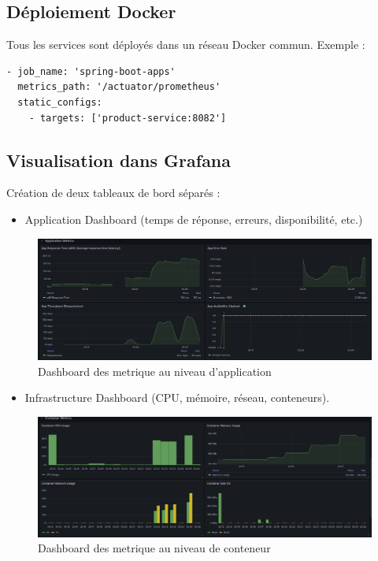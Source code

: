 \subsection{Déploiement Docker}
Tous les services sont déployés dans un réseau Docker commun.  
Exemple :
\begin{verbatim}
- job_name: 'spring-boot-apps'
  metrics_path: '/actuator/prometheus'
  static_configs:
    - targets: ['product-service:8082']
\end{verbatim}

\subsection{Visualisation dans Grafana}
Création de deux tableaux de bord séparés :
\begin{itemize}
    \item Application Dashboard (temps de réponse, erreurs, disponibilité, etc.)
\end{itemize}   
\begin{figure}[H]
\centering
\includegraphics[width=1\textwidth]{images/app_metrics_second.png}
\caption{Dashboard des metrique au niveau d'application}
\label{fig:architecture-overview}
\end{figure}
\begin{itemize}
    \item Infrastructure Dashboard (CPU, mémoire, réseau, conteneurs).
\end{itemize}
\begin{figure}[H]
\centering
\includegraphics[width=1\textwidth]{images/container_metrics_second.png}
\caption{Dashboard des metrique au niveau de conteneur}
\label{fig:architecture-overview}
\end{figure}
